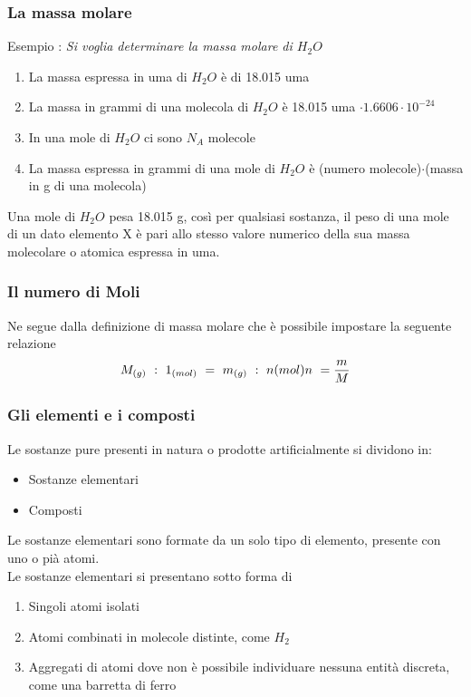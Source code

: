 \documentclass{article}
\begin{document}
\subsubsection{La massa molare}
Esempio : \textit{Si voglia determinare la massa molare di $H_2O$}
\begin{enumerate}
    \item La massa espressa in uma di $H_2O$ è di 18.015 uma  
    \item La massa in grammi di una molecola di $H_2O$ è 18.015 uma  $\cdot 1.6606\cdot 10^{-24}$
    \item In una mole di $H_2O$ ci sono $N_A$ molecole
    \item La massa espressa in grammi di una mole di $H_2O$ è (numero molecole)$\cdot$(massa in g di una molecola)
\end{enumerate}
Una mole di $H_2O$ pesa 18.015 g, così per qualsiasi sostanza, il peso di una mole di un dato elemento X
è pari allo stesso valore numerico della sua massa molecolare o atomica espressa in uma.

\subsubsection*{Il numero di Moli}
Ne segue dalla definizione di massa molare che è possibile impostare la seguente relazione
\begin{equation*}
    M_{(g)} \ : \ 1_{(mol)} \ = \ m_{(g)} \ :\ n{(mol)} \\
    n \ = \frac{m}{M}
\end{equation*}
\subsubsection{Gli elementi e i composti}
Le sostanze pure presenti in natura o prodotte artificialmente si dividono in:
\begin{itemize}
    \item Sostanze elementari
    \item Composti
\end{itemize}
Le sostanze elementari sono formate da un solo tipo di elemento, presente con uno o pià atomi.\\
Le sostanze elementari si presentano sotto forma di 
\begin{enumerate}
    \item Singoli atomi isolati
    \item Atomi combinati in molecole distinte, come $H_2$
    \item Aggregati di atomi dove non è possibile individuare nessuna entità discreta, come una barretta di ferro
\end{enumerate}
\end{document}
